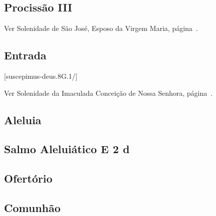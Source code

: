 \subsection{Procissão III}
\begin{rubrica}
    Ver Solenidade de São José, Esposo da Virgem Maria, página~\pageref{subsection:proprium-sanctorum/sancti-ioseph-sponsi-bmv/psalmus-responsorius}.
\end{rubrica}

\AllowPageFlush

\subsection{Entrada}\label{subsection:proprium-sanctorum/in-praesentatione-domini/introitus}
[suscepimus-deus.8G.1/]


\begin{rubrica}
    Ver Solenidade da Imaculada Conceição de Nossa Senhora, página~\pageref{subsection:proprium-sanctorum/in-conceptione-immaculata-bmv/psalmus-responsorius}.
\end{rubrica}

\subsection{Aleluia}\label{subsection:proprium-sanctorum/in-praesentatione-domini/alleluia}

\AllowPageFlush

\subsection[Salmo Aleluiático]{Salmo Aleluiático \textmd{E 2 d}}\label{subsection:proprium-sanctorum/in-praesentatione-domini/psalmus-alleluiaticus}

\AllowPageFlush

\subsection{Ofertório}\label{subsection:proprium-sanctorum/in-praesentatione-domini/offertorium}

\AllowPageFlush

\subsection{Comunhão}\label{subsection:proprium-sanctorum/in-praesentatione-domini/communio}
